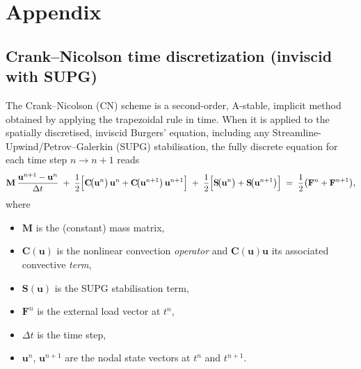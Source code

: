 \chapter{Appendix}

\section{Crank--Nicolson time discretization (inviscid with SUPG)}
\label{appendix:cranknicolson}

The Crank--Nicolson (CN) scheme is a second-order, A-stable, implicit method obtained by applying the trapezoidal rule in time.  When it is applied to the spatially discretised, inviscid Burgers’ equation, including any Streamline-Upwind/Petrov–Galerkin (SUPG) stabilisation, the fully discrete equation for each time step $n\to n+1$ reads
%
\begin{equation}
\mathbf M \,\frac{\mathbf u^{n+1}-\mathbf u^{n}}{\Delta t}
\;+\;
\frac12\Bigl[
   \mathbf C\!\bigl(\mathbf u^{n}\bigr)\,\mathbf u^{n}
  +\mathbf C\!\bigl(\mathbf u^{n+1}\bigr)\,\mathbf u^{n+1}
\Bigr]
\;+\;
\frac12\Bigl[
   \mathbf S\!\bigl(\mathbf u^{n}\bigr)
  +\mathbf S\!\bigl(\mathbf u^{n+1}\bigr)
\Bigr]
\;=\;
\frac12\bigl(\mathbf F^{n}+\mathbf F^{n+1}\bigr),
\label{eq:cn_supg}
\end{equation}
%
where

\begin{itemize}
  \item $\mathbf M$ is the (constant) mass matrix,
  \item $\mathbf C(\mathbf u)$ is the nonlinear convection \emph{operator} and
        $\mathbf C(\mathbf u)\mathbf u$ its associated convective \emph{term},
  \item $\mathbf S(\mathbf u)$ is the SUPG stabilisation term,
  \item $\mathbf F^{n}$ is the external load vector at $t^{n}$,
  \item $\Delta t$ is the time step,
  \item $\mathbf u^{n}$, $\mathbf u^{n+1}$ are the nodal state vectors at
        $t^{n}$ and $t^{n+1}$.
\end{itemize}

